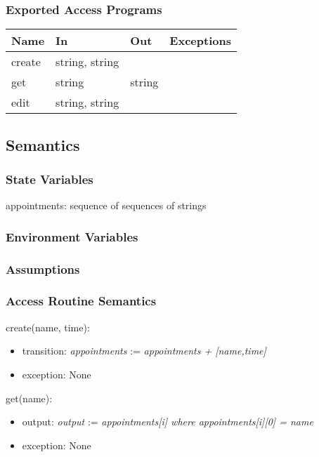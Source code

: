 \documentclass[12pt, titlepage]{article}
\begin{document}
\subsubsection{Exported Access Programs}

\begin{center}
\begin{tabular}{p{2cm} p{4cm} p{4cm} p{2cm}}
\hline
\textbf{Name} & \textbf{In} & \textbf{Out} & \textbf{Exceptions} \\
\hline
create & string, string & & \\
get & string & string & \\
edit & string, string & & \\
\hline
\end{tabular}
\end{center}

\subsection{Semantics}

\subsubsection{State Variables}

appointments: sequence of sequences of strings

\subsubsection{Environment Variables}

\subsubsection{Assumptions}

\subsubsection{Access Routine Semantics}

\noindent create(name, time):
\begin{itemize}
\item transition: \textit{appointments} := \textit{appointments + [name,time]}
\item exception: None
\end{itemize}

\noindent get(name):
\begin{itemize}
\item output: \textit{output} := \textit{appointments[i] where appointments[i][0] = name}
\item exception: None
\end{itemize}
\end{document}
